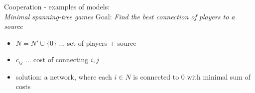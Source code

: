 \documentclass{beamer}
\begin{document}

\begin{frame}{Cooperation - examples of models:\\ \textit{Minimal spanning-tree games}}
	Goal: \textit{Find the best connection of players to a source}
	\begin{itemize}
		\item $N = N' \cup \{0\}$ ... set of players + source
		\item $c_{ij}$ ... cost of connecting $i,j$
		\item solution: a network, where each $i \in N$ is connected to $0$ with minimal sum of costs
	\end{itemize}
	
\end{frame}



\begin{comment}
    


\begin{frame}{Cooperation - examples of models: \textit{Market games}}
 	\begin{itemize}
 		\item $(N,\mathbb{R}^m_+,A,w)$ ... market
	\end{itemize}
	\begin{block}{Feasible S-allocation}
		\textbf{Feasible $S$-allocations} is $(a_S^i)_{i \in S}$ satisfying
		\[
		\sum_{i \in S}a^i_S = \sum_{i \in S}a^i.
		\]
		We denote the set of feasible $S$-allocations by $\mathcal{A}_S$.
	\end{block}
\end{frame}



\begin{frame}{Cooperation - examples of models: \textit{Market games}}
	\begin{itemize}
		\item $(N,\mathbb{R}^m_+,a,w)$ ... market
	\end{itemize}
	\begin{block}{Feasible S-allocation}
		\textbf{Feasible S-allocation} is $(a_S^i)_{i \in S}$ satisfying $\sum_{i \in S}a^i_S = \sum_{i \in S}a^i$.\\
		We denote the set of feasible $S$-allocations by $\mathcal{A}_S$.
	\end{block}
	\begin{block}{Market game}
		Cooperative game $(N,v)$ is \textbf{market game}, if there is market $(N,\mathbb{R}^m_+,A,w)$ satisfying
		\[
		v(S) = \max\{\sum_{i \in S}w^i(a_S^i)\mid (a_S^i)_{i \in S} \in \mathcal{A}_S\}.
		\]
	\end{block}
\end{frame}


\end{comment}
\end{document}
